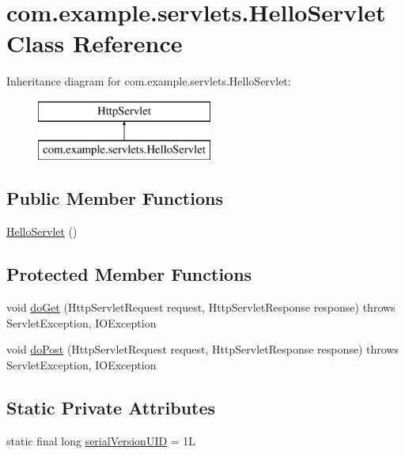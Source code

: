 \hypertarget{classcom_1_1example_1_1servlets_1_1_hello_servlet}{}\section{com.\+example.\+servlets.\+Hello\+Servlet Class Reference}
\label{classcom_1_1example_1_1servlets_1_1_hello_servlet}
Inheritance diagram for com.\+example.\+servlets.\+Hello\+Servlet\+:\begin{figure}[H]
\begin{center}
\leavevmode
\includegraphics[height=2.000000cm]{classcom_1_1example_1_1servlets_1_1_hello_servlet}
\end{center}
\end{figure}
\subsection*{Public Member Functions}
\begin{DoxyCompactItemize}
\item 
\hyperlink{classcom_1_1example_1_1servlets_1_1_hello_servlet_acde0125d36d0d4cbbe7ed5d5ccc93c54}{Hello\+Servlet} ()
\end{DoxyCompactItemize}
\subsection*{Protected Member Functions}
\begin{DoxyCompactItemize}
\item 
void \hyperlink{classcom_1_1example_1_1servlets_1_1_hello_servlet_aebf5d769bdf4e1181b45c870ee9d9c49}{do\+Get} (Http\+Servlet\+Request request, Http\+Servlet\+Response response)  throws Servlet\+Exception, I\+O\+Exception 
\item 
void \hyperlink{classcom_1_1example_1_1servlets_1_1_hello_servlet_add7f3c9daaaccbe81fe119dd8ae99ae4}{do\+Post} (Http\+Servlet\+Request request, Http\+Servlet\+Response response)  throws Servlet\+Exception, I\+O\+Exception 
\end{DoxyCompactItemize}
\subsection*{Static Private Attributes}
\begin{DoxyCompactItemize}
\item 
static final long \hyperlink{classcom_1_1example_1_1servlets_1_1_hello_servlet_aee3a8f698be2149a6d0c401ab648cf82}{serial\+Version\+U\+ID} = 1L
\end{DoxyCompactItemize}


